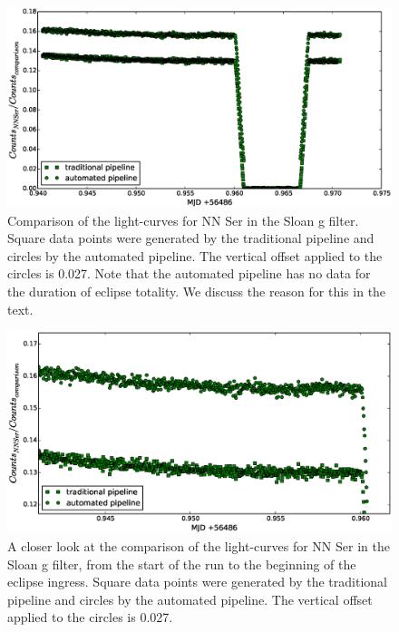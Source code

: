 \begin{figure}
\centering
\includegraphics[width=140mm]{images/nn_ser_compare_g.eps}
\caption{Comparison of the light-curves for NN Ser in the Sloan g filter. Square data points were generated by the traditional pipeline and circles by the automated pipeline. The vertical offset applied to the circles is 0.027. Note that the automated pipeline has no data for the duration of eclipse totality. We discuss the reason for this in the text.}
\label{fig:comparepipelines_g}
\end{figure}

\begin{figure}
\centering
\includegraphics[width=140mm]{images/nn_ser_compare_zoom_g.eps}
\caption{A closer look at the comparison of the light-curves for NN Ser in the Sloan g filter, from the start of the run to the beginning of the eclipse ingress. Square data points were generated by the traditional pipeline and circles by the automated pipeline. The vertical offset applied to the circles is 0.027. }
\label{fig:comparepipelines_zoom_g}
\end{figure}


